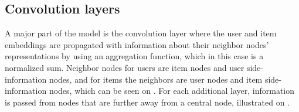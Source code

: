 \subsection{Convolution layers}\label{subsec:csgcn_is_conv_layer}
A major part of the model is the convolution layer where the user and item embeddings are propagated with information about their neighbor nodes' representations by using an aggregation function, which in this case is a normalized sum.
Neighbor nodes for users are item nodes and user side-information nodes, and for items the neighbors are user nodes and item side-information nodes, which can be seen on .
For each additional layer, information is passed from nodes that are further away from a central node, illustrated on .
\begin{figure}[h]
    \centering
    
    \begin{tikzpicture}[x=0.5pt,y=0.5pt,yscale=-1,xscale=1]
    

\end{tikzpicture}
\end{figure}
